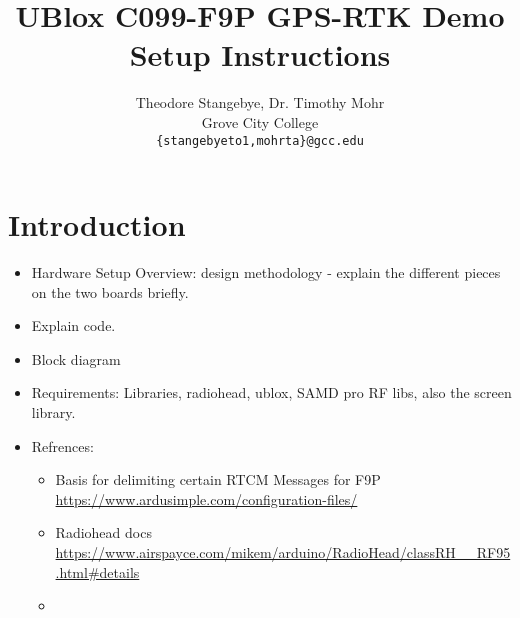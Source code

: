 \documentclass{article}%
\begin{document}
\title{UBlox C099-F9P GPS-RTK Demo Setup Instructions}
\author{Theodore Stangebye, Dr. Timothy Mohr\\
Grove City College\\
\texttt{\{stangebyeto1,mohrta\}@gcc.edu}}
\maketitle






\vspace*{\fill}
\tableofcontents
\vspace*{\fill}

\newpage

\section{Introduction}

\begin{itemize}
	\item Hardware Setup Overview: design methodology - explain the different pieces on the two boards briefly.
	\item Explain code.
	\item Block diagram
	\item Requirements: Libraries, radiohead, ublox, SAMD pro RF libs, also the screen library.
	\item Refrences:
	\begin{itemize}
		\item Basis for delimiting certain RTCM Messages for F9P \url{https://www.ardusimple.com/configuration-files/}
		\item Radiohead docs \url{https://www.airspayce.com/mikem/arduino/RadioHead/classRH__RF95.html#details}
		\item 
	\end{itemize}
\end{itemize}



\

\begin{appendices}


\section{}
\end{appendices}
\end{document}
